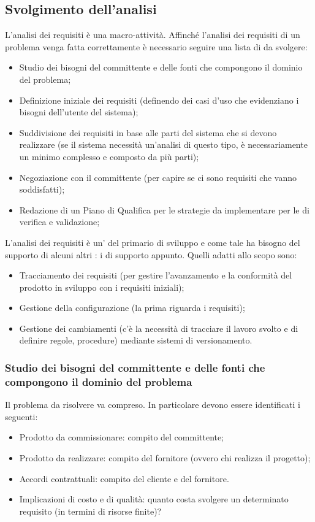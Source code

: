 \documentclass[../main]{subfiles}
\begin{document}
\subsection{Svolgimento dell'analisi}
L'analisi dei requisiti è una macro-attività. Affinché l'analisi dei requisiti di un problema venga fatta correttamente è necessario seguire una lista di  da svolgere:
\begin{itemize}
    \item Studio dei bisogni del committente e delle fonti che compongono il dominio del problema;
    \item Definizione iniziale dei requisiti (definendo dei casi d'uso che evidenziano i bisogni dell'utente del sistema);
    \item Suddivisione dei requisiti in base alle parti del sistema che si devono realizzare (se il sistema necessità un'analisi di questo tipo, è necessariamente un minimo complesso e composto da più parti);
    \item Negoziazione con il committente (per capire se ci sono requisiti che vanno soddisfatti);
    \item Redazione di un Piano di Qualifica per le strategie da implementare per le  di verifica e validazione;
\end{itemize}
L'analisi dei requisiti è un' del  primario di sviluppo e come tale ha bisogno del supporto di alcuni altri : i  di supporto appunto. Quelli adatti allo scopo sono:
\begin{itemize}
    \item Tracciamento dei requisiti (per gestire l'avanzamento e la conformità del prodotto in sviluppo con i requisiti iniziali);
    \item Gestione della configurazione (la prima  riguarda i requisiti);
    \item Gestione dei cambiamenti (c'è la necessità di tracciare il lavoro svolto e di definire regole, procedure) mediante sistemi di versionamento.
\end{itemize}
\subsubsection{Studio dei bisogni del committente e delle fonti che compongono il dominio del problema}
Il problema da risolvere va compreso. In particolare devono essere identificati i seguenti:
\begin{itemize}
    \item Prodotto da commissionare: compito del committente;
    \item Prodotto da realizzare: compito del fornitore (ovvero chi realizza il progetto);
    \item Accordi contrattuali: compito del cliente e del fornitore.
    \item Implicazioni di costo e di qualità: quanto costa svolgere un determinato requisito (in termini di risorse finite)?
\end{itemize}
\end{document}
